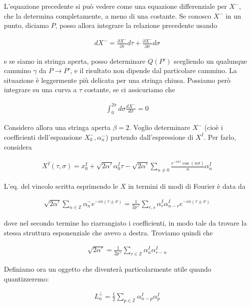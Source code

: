\documentclass{report}
\begin{document}
L'equazione precedente si può vedere come una equazione differenziale per \(X^-\), che la determina completamente, a meno di una costante. Se conosco \(X^-\) in un punto, diciamo \(P\), posso allora integrare la relazione precedente usando 

\begin{align}
    dX^- = \frac{\partial X^-}{\partial \tau}d\tau + \frac{\partial X^-}{\partial \sigma}d\sigma 
\end{align}

e se siamo in stringa aperta, posso determinare \(Q(P')\) scegliendo un qualunque cammino \(\gamma\) da \(P \to P'\), e il risultato non dipende dal particolare cammino. La situazione è leggermente più delicata per una stringa chiusa. Possiamo però integrare su una curva a \(\tau\) costante, se ci assicuriamo che 

\begin{align}
    \int_0^{2\pi}d\sigma \frac{dX^-}{d\sigma} = 0
\end{align}

Considero allora una stringa aperta \(\beta =2\). Voglio determinare \(X^-\) (cioè i coefficienti dell'espansione \(X^-_0, \alpha^-_n\)) partendo dall'espressione di \(X^I\). Per farlo, considera

\begin{align}
    X^I(\tau, \sigma) = x_0^I +\sqrt{2\alpha'}\alpha_0^I \tau -\sqrt{2\alpha'}\sum_{n\neq 0}\frac{e^{-in\tau}\cos(n\sigma)}{n}\alpha_n^I
\end{align}

L'eq. del vincolo scritta esprimendo le \(X\) in termini di modi di Fourier è data da 

\begin{align}
    \sqrt{2\alpha'}\sum_{n\in \mathbb{Z}}\alpha^-_n e^{-in(\tau \pm \sigma)} = \frac{1}{2p^+}\sum_{r,s}\alpha_r^I \alpha_{n-r}^I e^{-in(\tau \pm \sigma)}
\end{align}

dove nel secondo termine ho riarrangiato i coefficienti, in modo tale da trovare la stessa struttura esponenziale che avevo a destra. Troviamo quindi che 

\begin{align}
    \sqrt{2\alpha'} = \frac{1}{2p^+}\sum_{r\in\mathbb{Z}}\alpha^I_n\alpha^I_{r-n} 
\end{align}

Definiamo ora un oggetto che diventerà particolarmente utile quando quantizzeremo: 

\begin{align}
    L_n^\perp = \frac{1}{2}\sum_{p\in \mathbb{Z}}\alpha^I_{n-p}\alpha^I_p
\end{align}
\end{document}
